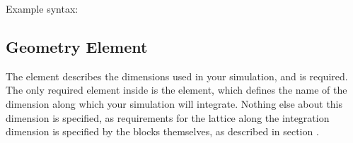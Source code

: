 \documentclass[letterpaper,10pt,english]{sphinxmanual}
\begin{document}
\sphinxAtStartPar
Example syntax:

\begin{sphinxVerbatim}[commandchars=\\\{\}]
 
      
       
       
       
\end{sphinxVerbatim}

\ignorespaces 

\subsection{Geometry Element}
\label{\detokenize{reference_elements:geometry-element}}\label{\detokenize{reference_elements:geometryelement}}\label{\detokenize{reference_elements:index-24}}
\ignorespaces {}\label{\detokenize{reference_elements:propagationdimensionelement}}
\sphinxAtStartPar
The  element describes the dimensions used in your simulation, and is required.  The only required element inside is the  element, which defines the name of the dimension along which your simulation will integrate.  Nothing else about this dimension is specified, as requirements for the lattice along the integration dimension is specified by the  blocks themselves, as described in section {\hyperref[\detokenize{reference_elements:integrateelement}]{}}.
\end{document}
